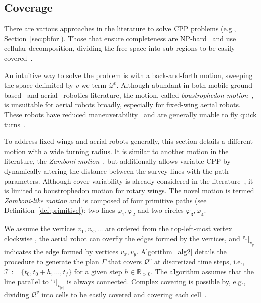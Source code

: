\documentclass[letterpaper,10pt,journal,twoside]{IEEEtran}
\theoremstyle{definition}
\begin{document}
\vspace*{-1.4ex}
\subsection{Coverage}
\label{sec:cov-algo}

There are various approaches in the literature to solve CPP problems (e.g., Section~\ref{sec:pbfor}). Those that ensure %
completeness %
are NP-hard~\cite{arkin2000approximation} and use cellular decomposition, dividing the free-space into sub-regions to be easily covered~\cite{choset2001coverage,galceran2013survey}.

An intuitive way to solve the problem is with a back-and-forth motion, sweeping the space delimited by $v$ we term $\mathcal{Q}^v$. Although abundant in both mobile ground-based~\cite{choset2001coverage%
} and aerial~\cite{araujo2013multiple,%
cabreira2018energy,difranco2015energy} robotics literature, the motion, called \emph{boustrophedon motion}~\cite{choset2001coverage}, is unsuitable for aerial robots broadly, especially for fixed-wing aerial robots. These robots have reduced maneuverability~\cite{dille2013efficient,mannadiar2010optimal,%
xu2014efficient} and are generally unable to fly quick turns~\cite{wang2017curvature}.

To address fixed wings and aerial robots generally, this section details a different motion with a wide turning radius. It is similar to another motion in the literature, the \emph{Zamboni motion}~\cite{araujo2013multiple}, but additionally allows variable CPP %
{\color{blue} by dynamically altering the distance between the survey lines with the path parameters}. 
{\color{blue} Although cover variability is already considered in the literature~\cite{difranco2015energy}, it is limited to boustrophedon motion for rotary wings.}
The novel motion is termed \emph{Zamboni-like motion} and is composed of four primitive paths (see Definition~\ref{def:primitive}): two lines $\varphi_1,\varphi_2$ and two circles $\varphi_3,\varphi_4$.%

We assume the vertices $v_1,v_2,\dots$ are ordered from the top-left-most vertex %
clockwise%
, the aerial robot can overfly the edges formed by the vertices, and ${}^{v_x}|_{v_y}$ indicates the edge formed by vertices $v_x,v_y$. 
Algorithm~\ref{alg2} details the procedure to generate the plan $\Gamma$ that covers $\mathcal{Q}^v$ %
{\color{blue}at }discretized time step{\color{blue}s}, i.e., $\mathcal{T}:=\{t_0,t_0+h,\dots,t_f\}$ for a given step $h\in\mathbb{R}_{>0}$. The algorithm assumes that the line parallel to ${}^{v_1}|_{v_{|v|}}$ is always connected. %
{\color{blue}C}omplex covering is possible by, e.g., dividing $\mathcal{Q}^{v}$ into cells to be easily covered and %
covering each cell~\cite{choset2001coverage}.%
\end{document}
